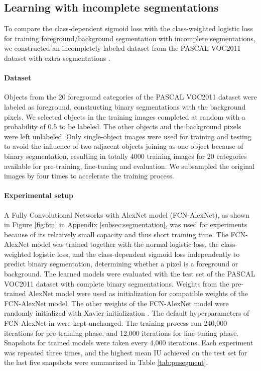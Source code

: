 \subsection{Learning with incomplete segmentations}
\label{subsec:incomplete}
To compare the class-dependent sigmoid loss with the class-weighted logistic loss for training foreground/background segmentation with incomplete segmentations, we constructed an incompletely labeled dataset from the PASCAL VOC2011 dataset \cite{everingham2015pascal} with extra segmentations \cite{hariharan2011semantic}.

\paragraph{Dataset}
Objects from the 20 foreground categories of the PASCAL VOC2011 dataset were labeled as foreground, constructing binary segmentations with the background pixels.
We selected objects in the training images completed at random with a probability of 0.5 to be labeled.
The other objects and the background pixels were left unlabeled.
Only single-object images were used for training and testing to avoid the influence of two adjacent objects joining as one object because of binary segmentation, resulting in totally 4000 training images for 20 categories available for pre-training, fine-tuning and evaluation.
We subsampled the original images by four times to accelerate the training process.


\paragraph{Experimental setup}
A Fully Convolutional Networks with AlexNet model (FCN-AlexNet), as shown in Figure \ref{fig:fcn} in Appendix \ref{subsec:segmentation}, was used for experiments because of its relatively small capacity and thus short training time.
The FCN-AlexNet model was trained together with the normal logistic loss, the class-weighted logistic loss, and the class-dependent sigmoid loss independently to predict binary segmentation, determining whether a pixel is a foreground or background.
The learned models were evaluated with the test set of the PASCAL VOC2011 dataset with complete binary segmentations.
Weights from the pre-trained AlexNet model \cite{krizhevsky2012imagenet} were used as initialization for compatible weights of the FCN-AlexNet model.
The other weights of the FCN-AlexNet model were randomly initialized with Xavier initialization \cite{glorot2010understanding}.
The default hyperparameters of FCN-AlexNet in \cite{long2015fully} were kept unchanged.
The training process run 240,000 iterations for pre-training phase, and 12,000 iterations for fine-tuning phase.
Snapshots for trained models were taken every 4,000 iterations.
Each experiment was repeated three times, and the highest mean IU achieved on the test set for the last five snapshots were summarized in Table \ref{tab:pusegment}.


